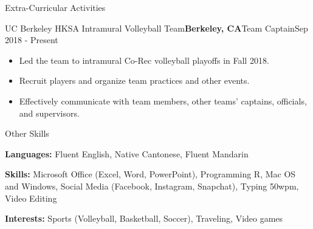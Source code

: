 \documentclass{resume} %
\begin{document}
\begin{rSection}{Extra-Curricular Activities} 

\begin{rSubsection}{UC Berkeley HKSA Intramural Volleyball Team}{\bf {Berkeley, CA}}{Team Captain}{Sep 2018 - Present}
\begin{itemize}
    \item Led the team to intramural Co-Rec volleyball playoffs in Fall 2018.
    \item Recruit players and organize team practices and other events.
    \item Effectively communicate with team members, other teams’ captains, officials, and supervisors.
\end{itemize}
\end{rSubsection}

\end{rSection}


\begin{rSection}{Other Skills}

{\bf Languages:} Fluent English, Native Cantonese, Fluent Mandarin %
\item {\bf Skills:} Microsoft Office (Excel, Word, PowerPoint), Programming R, Mac OS and Windows, Social Media (Facebook, Instagram, Snapchat), Typing 50wpm, Video Editing %
\item {\bf Interests:} Sports (Volleyball, Basketball, Soccer), Traveling, Video games %

\end{rSection}
\end{document}

